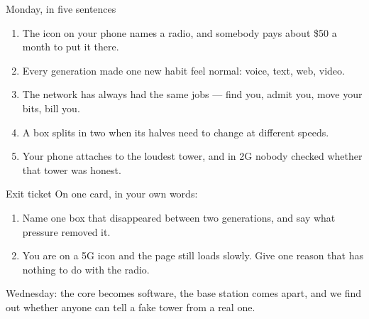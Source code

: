 

\begin{frame}{Monday, in five sentences}
  \vspace{0.5em}
  \small
  \begin{enumerate}\itemsep7pt
    \item The icon on your phone names a radio, and somebody pays about \$50 a
      month to put it there.
    \item Every generation made one new habit feel normal: voice, text, web,
      video.
    \item The network has always had the same jobs --- find you, admit you,
      move your bits, bill you.
    \item A box splits in two when its halves need to change at different speeds.
    \item Your phone attaches to the loudest tower, and in 2G nobody checked
      whether that tower was honest.
  \end{enumerate}

  \vspace{0.8em}
\end{frame}

\begin{frame}{Exit ticket}
  \vspace{0.8em}
  \large
  On one card, in your own words:

  \vspace{1.0em}
  \normalsize
  \begin{enumerate}\itemsep10pt
    \item Name one box that disappeared between two generations, and say what
      pressure removed it.
    \item You are on a 5G icon and the page still loads slowly. Give one reason
      that has nothing to do with the radio.
  \end{enumerate}

  \vspace{1.2em}
  {\small\textcolor{softgray}{Wednesday: the core becomes software, the base station
   comes apart, and we find out whether anyone can tell a fake tower from a real
   one.}\par}
\end{frame}
